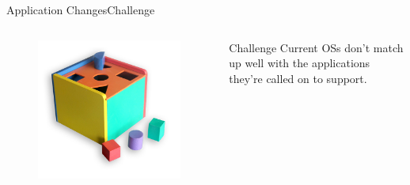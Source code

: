 \documentclass[10pt]{beamer}
\begin{document}
\begin{frame}{Application Changes}{Challenge}
  \begin{columns}[T] %
    \begin{column}{.2\textwidth}
      \begin{figure}[ht]
        \includegraphics[width=1.5\textwidth, keepaspectratio=true]{images/challenge.png}
      \end{figure}
    \end{column}

    \hfill
    \begin{column}{.7\textwidth}
      \begin{block}{Challenge}
        Current OSs don't match up well with the applications they're called on to
        support.
      \end{block}
    \end{column}
  \end{columns}
\end{frame}
\end{document}
